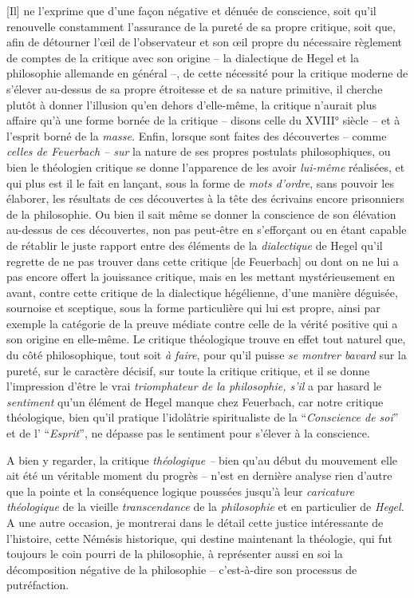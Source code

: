 \documentclass[french,twoside]{book} %
\begin{document}
[Il] ne l’exprime que d’une façon négative et dénuée de conscience, soit qu’il renouvelle constamment l’assurance de la pureté de sa propre critique, soit que, afin de détourner l’œil de l’observateur et son œil propre du nécessaire règlement de comptes de la critique avec son origine – la dialectique de Hegel et la philosophie allemande en général –, de cette nécessité pour la critique moderne de s’élever au-dessus de sa propre étroitesse et de sa nature primitive, il cherche plutôt à donner l’illusion qu’en dehors d’elle-même, la critique n’aurait plus affaire qu’à une forme bornée de la critique – disons celle du XVIII° siècle – et à l’esprit borné de la \emph{masse.} Enfin, lorsque sont faites des découvertes – comme \emph{celles de Feuerbach – sur} la nature de ses propres postulats philosophiques, ou bien le théologien critique se donne l’apparence de les avoir \emph{lui-même} réalisées, et qui plus est il le fait en lançant, sous la forme de \emph{mots d’ordre}, sans pouvoir les élaborer, les résultats de ces découvertes à la tête des écrivains encore prisonniers de la philosophie. Ou bien il sait même se donner la conscience de son élévation au-dessus de ces découvertes, non pas peut-être en s’efforçant ou en étant capable de rétablir le juste rapport entre des éléments de la \emph{dialectique} de Hegel qu’il regrette de ne pas trouver dans cette critique [de Feuerbach] ou dont on ne lui a pas encore offert la jouissance critique, mais en les mettant mystérieusement en avant, contre cette critique de la dialectique hégélienne, d’une manière déguisée, sournoise et sceptique, sous la forme particulière qui lui est propre, ainsi par exemple la catégorie de la preuve médiate contre celle de la vérité positive qui a son origine en elle-même. Le critique théologique trouve en effet tout naturel que, du côté philosophique, tout soit \emph{à faire}, pour qu’il puisse \emph{se montrer bavard} sur la pureté, sur le caractère décisif, sur toute la critique critique, et il se donne l’impression d’être le vrai \emph{triomphateur de la philosophie, s’il} a par hasard le \emph{sentiment} qu’un élément de Hegel manque chez Feuerbach, car notre critique théologique, bien qu’il pratique l’idolâtrie spiritualiste de la “\emph{Conscience de soi}” et de l’ “\emph{Esprit}”, ne dépasse pas le sentiment pour s’élever à la conscience.\par
A bien y regarder, la critique \emph{théologique –} bien qu’au début du mouvement elle ait été un véritable moment du progrès – n’est en dernière analyse rien d’autre que la pointe et la conséquence logique poussées jusqu’à leur \emph{caricature théologique} de la vieille \emph{transcendance} de la \emph{philosophie} et en particulier de \emph{Hegel.} A une autre occasion, je montrerai dans le détail cette justice intéressante de l’histoire, cette Némésis historique, qui destine maintenant la théologie, qui fut toujours le coin pourri de la philosophie, à représenter aussi en soi la décomposition négative de la philosophie – c’est-à-dire son processus de putréfaction.\par
\end{document}
